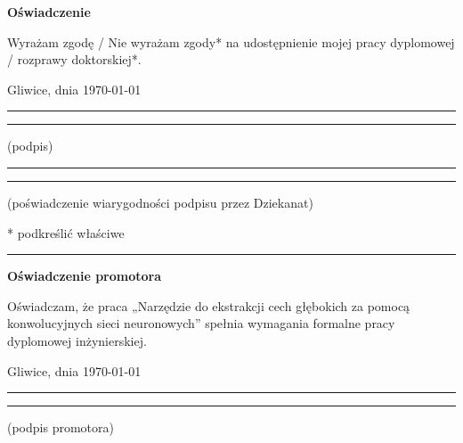 \documentclass[a4paper,twoside,12pt]{book}
\newcommand{\tytul}{Narzędzie do ekstrakcji cech głębokich za pomocą konwolucyjnych sieci neuronowych}
\begin{document}
\vfill  

\begin{center}
\Large\bfseries Oświadczenie
\end{center}

\vfill

Wyrażam  zgodę / Nie wyrażam zgody*  na  udostępnienie  mojej  pracy  dyplomowej / rozprawy doktorskiej*.

\vfill

Gliwice, dnia \today

\vfill

\rule{0.5\textwidth}{0cm}\dotfill 

\rule{0.5\textwidth}{0cm}
\begin{minipage}{0.45\textwidth}
{\begin{center}(podpis)\end{center}}
\end{minipage} 

\vfill

\rule{0.5\textwidth}{0cm}\dotfill 

\rule{0.5\textwidth}{0cm}
\begin{minipage}{0.45\textwidth}
{\begin{center}\rule{0mm}{5mm}(poświadczenie wiarygodności podpisu przez Dziekanat)\end{center}}
\end{minipage}


\vfill

* podkreślić właściwe

 


\cleardoublepage

\rule{1cm}{0cm}

\vfill  

\begin{center}
\Large\bfseries Oświadczenie promotora
\end{center}

\vfill

Oświadczam, że praca „\tytul” spełnia wymagania formalne pracy dyplomowej inżynierskiej.

\vfill



\vfill

Gliwice, dnia \today

\rule{0.5\textwidth}{0cm}\dotfill 

\rule{0.5\textwidth}{0cm}
\begin{minipage}{0.45\textwidth}
{\begin{center}(podpis promotora)\end{center}}
\end{minipage} 
\end{document}
